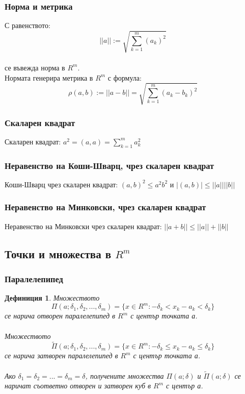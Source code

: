 \documentclass[fleqn]{article}
\newtheorem{definition}{Дефиниция}[subsection]
\begin{document}
\subsubsection{Норма и метрика}
С равенството:
$$||a|| := \sqrt{ \sum_{k=1}^{m}(a_k)^2  }$$ \\
се въвежда норма в $R^m$.
\\
 Нормата генерира метрика в $R^m$ с формула: 
$$\rho(a,b) := ||a-b|| = \sqrt{ \sum_{k=1}^{m} (a_k - b_k)^2} $$
\subsubsection{Скаларен квадрат}
Скаларен квадрат: $a^2 = (a,a) = \sum _{k=1}^{m}a_k^2$
\subsubsection{Неравенство на Коши-Шварц, чрез скаларен квадрат}
Коши-Шварц чрез скаларен квадрат: $(a,b)^2 \leq a^2b^2$ и $|(a,b)|\leq ||a|| ||b||$
\subsubsection{Неравенство на Минковски, чрез скаларен квадрат}
Неравенство на Минковски чрез скаларен квадрат: $||a+b||\leq ||a|| + ||b||$
\subsection{Точки и множества в $R^m$}

\subsubsection{Паралелепипед}
	\begin{definition}
Множеството\\
$$\Pi (a; \delta_1, \delta_2, ... ,\delta_m) = \{ x \in R^m: -\delta_k < x_k -a_k < \delta_k   \}$$
се нарича отворен паралелепипед в $R^m$ с център точката а.\\
\\
Множеството\\
$$\widetilde\Pi (a; \delta_1, \delta_2, ... ,\delta_m) = \{ x \in R^m: -\delta_k \leq x_k -a_k \leq \delta_k   \}$$
се нарича затворен паралелепипед в $R^m$ с център точката а.\\
\\
Ако $\delta_1 = \delta_2 = ... = \delta_m = \delta$, получените множества $\Pi (a; \delta)$ и $\widetilde\Pi (a; \delta)$ се  наричат съответно отворен и затворен куб в $R^m$ с център а.
 	\end{definition}
\end{document}
